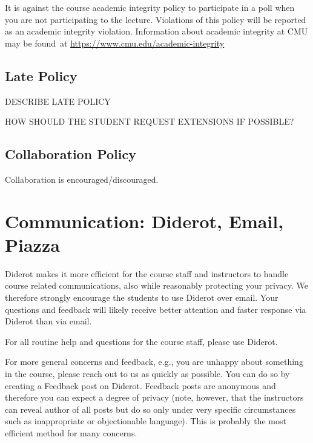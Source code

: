 \begin{gram}
It is against the course academic integrity policy to participate in a poll when you are not participating to the lecture. 
%
Violations of this policy will be reported as an academic integrity violation. Information about academic integrity at CMU may be found at \href{https://www.cmu.edu/academic-integrity}{https://www.cmu.edu/academic-integrity}
\end{gram}

\subsection{Late Policy}

DESCRIBE LATE POLICY

HOW SHOULD THE STUDENT REQUEST EXTENSIONS IF POSSIBLE?

\subsection{ Collaboration Policy}

Collaboration is encouraged/discouraged.


\section{Communication: Diderot, Email, Piazza}

\begin{gram}
Diderot makes it more efficient for the course staff and instructors
to handle course related communications, also while reasonably
protecting your privacy.
%
We therefore strongly encourage the students to use Diderot over email. 
%
Your questions and feedback will likely receive better attention and
faster response via Diderot than via email.


For all routine help and questions for the course staff, please use Diderot. 

For more general concerns and feedback, e.g., you are unhappy about
something in the course, please reach out to us as quickly as
possible.  You can do so by creating a Feedback post on Diderot.
Feedback posts are anonymous and therefore you can expect a degree of
privacy (note, however, that the instructors can reveal author of all
posts but do so only under very specific circumstances such as
inappropriate or objectionable language).  This is probably the most
efficient method for many concerns.  

\end{gram}

